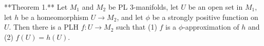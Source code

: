 **Theorem 1.** Let $M_1$ and $M_2$ be PL 3-manifolds, let $U$ be an open set in $M_1$, let $h$ be a homeomorphism $U \rightarrow M_2$, and let $\phi$ be a strongly positive function on $U$. Then there is a PLH $f: U \rightarrow M_2$ such that (1) $f$ is a $\phi$-approximation of $h$ and (2) $f(U) = h(U)$.
